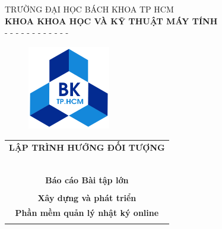 \documentclass[a4paper]{article}
\begin{document}
\begin{titlepage}
\vspace{0cm}
\begin{center}
TRƯỜNG ĐẠI HỌC BÁCH KHOA TP HCM \\
\textbf{KHOA KHOA HỌC VÀ KỸ THUẬT MÁY TÍNH } \\
- - - - - - - - - - - -
\end{center}


\vspace{1cm}
\begin{figure}[h!]
\begin{center}
\includegraphics[width=3.6cm]{Images/hcmut.png}
\end{center}
\end{figure}
\vspace{1cm}



\begin{center}
\begin{tabular}{c}
\multicolumn{1}{c}{\textbf{{\huge LẬP TRÌNH HƯỚNG ĐỐI TƯỢNG}}}\\
~~\\
\hline
\\

\multicolumn{1}{c}{\textbf{{\Large Báo cáo Bài tập lớn }}}\\
\\

\textbf{{\Huge Xây dựng và phát triển}} \\
\textbf{{\Huge Phần mềm quản lý nhật ký online}}\\
\\
\hline
\end{tabular}
\end{center}


\end{titlepage}
\end{document}
